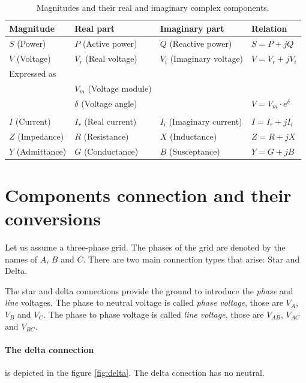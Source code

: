 \documentclass{tufte-book}
\begin{document}
\begin{table}[h]
\begin{center}
\footnotesize
\begin{tabular}{llll}
\toprule
Magnitude & Real part & Imaginary part & Relation\\
\midrule
$S$ (Power) & $P$ (Active power) & $Q$ (Reactive power) & $S=P +jQ$\\
$V$ (Voltage) & $V_r$ (Real voltage) & $V_i$ (Imaginary voltage) & $V=V_r +jV_i$\\
Expressed as  &  &  & \\
 & $V_m$ (Voltage module) &  & \\
 & $\delta$ (Voltage angle) &  & $V = V_m \cdot e^\delta$\\
  &  &  & \\
$I$ (Current) & $I_r$ (Real current) & $I_i$ (Imaginary current) & $I=I_r +jI_i$\\
$Z$ (Impedance) & $R$ (Resistance) & $X$ (Inductance) & $Z=R +jX$\\
$Y$ (Admittance) & $G$ (Conductance) & $B$ (Susceptance) & $Y=G +jB$\\
\bottomrule
\end{tabular}
\end{center}
  \caption{Magnitudes and their real and imaginary complex components.}
  \label{real_imaginary_table}
\end{table}






\section{Components connection and their conversions}

Let us assume a three-phase grid. The phases of the grid are denoted by the names of $A$, $B$ and $C$. There are two main connection types that arise: Star and Delta.

The star and delta connections provide the ground to introduce the \textit{phase} and \textit{line} voltages. The phase to neutral voltage is called \textit{phase voltage}, those are $V_A$, $V_B$ and $V_C$. The phase to phase voltage is called \textit{line voltage}, those are $V_{AB}$, $V_{AC}$ and $V_{BC}$.

\paragraph{The delta connection} is depicted in the figure \ref{fig:delta}. The delta conection has no neutral.
\end{document}
